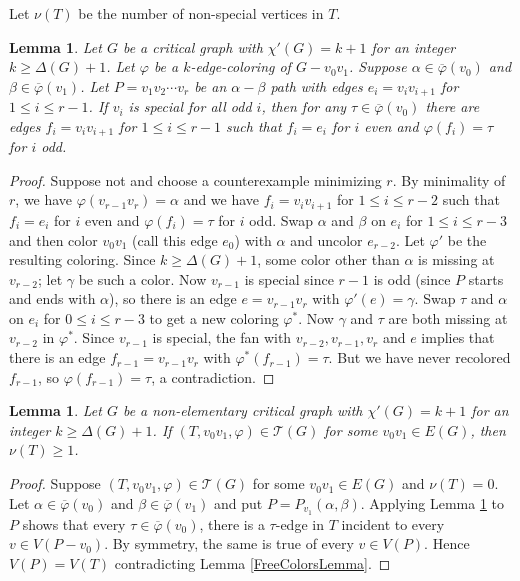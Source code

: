 \documentclass[12pt]{amsart}
\theoremstyle{plain}
\newtheorem{lem}[thm]{Lemma}
\theoremstyle{definition}
\theoremstyle{remark}
\newcommand{\fancy}[1]{\mathcal{#1}}
\newcommand{\T}{\fancy{T}}
\newcommand{\vph}{\varphi}
\newcommand{\vphn}{\overline{\varphi}}
\begin{document}
Let $\nu(T)$ be the number of non-special vertices in $T$.
\begin{lem}\label{SpecialPath}
Let $G$ be a critical graph with $\chi'(G) = k+1$ for an integer $k \ge \Delta(G) + 1$.
Let $\vph$ be a $k$-edge-coloring of $G-v_0v_1$.  Suppose $\alpha \in \vphn(v_0)$ and $\beta \in \vphn(v_1)$.  
Let $P = v_1v_2\cdots v_r$ be an $\alpha-\beta$ path
with edges $e_i = v_iv_{i+1}$ for $1 \le i \le r-1$.  If $v_i$ is special for
all odd $i$, then for any $\tau \in \vphn(v_0)$ there are edges $f_i =
v_iv_{i+1}$ for $1 \le i \le r-1$ such that $f_i = e_i$ for $i$ even and
$\vph(f_i) = \tau$ for $i$ odd.
\end{lem}
\begin{proof}
Suppose not and choose a counterexample minimizing $r$.  By minimality of
$r$, we have $\vph(v_{r-1}v_r) = \alpha$ and we have $f_i = v_iv_{i+1}$ for
$1 \le i \le r-2$ such that $f_i = e_i$ for $i$ even and $\vph(f_i) = \tau$ for
$i$ odd.  Swap $\alpha$ and $\beta$ on $e_i$ for $1 \le i \le r-3$ and then
color $v_0v_1$ (call this edge $e_0$) with $\alpha$ and uncolor $e_{r-2}$.  Let
$\vph'$ be the resulting coloring.  Since $k \ge \Delta(G) + 1$, some color
other than $\alpha$ is missing at $v_{r-2}$; let $\gamma$ be such a color.  Now 
$v_{r-1}$ is special since $r-1$ is odd (since $P$ starts and ends with
$\alpha$), so there is an edge $e = v_{r-1}v_r$ with $\vph'(e) = \gamma$.  
Swap $\tau$ and $\alpha$ on $e_i$ for $0 \le i \le r-3$ to get a new coloring
$\vph^*$.  Now $\gamma$ and $\tau$ are both missing at $v_{r-2}$ in $\vph^*$.
Since $v_{r-1}$ is special, the fan with $v_{r-2}, v_{r-1}, v_r$ and $e$
implies that there is an edge $f_{r-1} = v_{r-1}v_r$ with $\vph^*(f_{r-1}) =
\tau$.  But we have never recolored $f_{r-1}$, so $\vph(f_{r-1})=\tau$, a
contradiction.
\end{proof}

\begin{lem}\label{ZeroNonSpecial}
Let $G$ be a non-elementary critical graph with $\chi'(G) = k+1$ for an integer $k \ge \Delta(G) + 1$.
If $(T, v_0v_1, \vph) \in \T(G)$ for some $v_0v_1 \in E(G)$, then $\nu(T) \ge 1$.
\label{lem2}
\end{lem}
\begin{proof}
Suppose $(T, v_0v_1, \vph) \in \T(G)$ for some $v_0v_1 \in E(G)$ and $\nu(T) = 0$.
Let $\alpha \in \vphn(v_0)$ and $\beta \in \vphn(v_1)$ and put $P = P_{v_1}(\alpha, \beta)$.  Applying Lemma \ref{SpecialPath} to $P$ shows that every $\tau \in \vphn(v_0)$, 
there is a $\tau$-edge in $T$ incident to every $v \in V(P - v_0)$. By symmetry, the same is true of every $v \in V(P)$.  Hence $V(P) = V(T)$ contradicting Lemma \ref{FreeColorsLemma}.
\end{proof}
\end{document}
